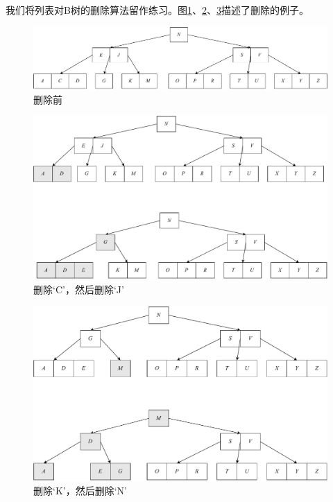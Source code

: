 \documentclass[b5paper]{ctexart}
\begin{document}
我们将列表对B树的删除算法留作练习。图\cref{fig:btree-del-before}、\cref{fig:btree-del-CJ}、\cref{fig:btree-del-KN}描述了删除的例子。

\begin{figure}[htbp]
  \centering
  \includegraphics[scale=0.33]{img/btree-del-before}
  \caption{删除前}
  \label{fig:btree-del-before}
\end{figure}

\begin{figure}[htbp]
  \centering
  \includegraphics[scale=0.33]{img/btree-del-CJ}
  \caption{删除`C'，然后删除`J'}
  \label{fig:btree-del-CJ}
\end{figure}

\begin{figure}[htbp]
  \centering
  \includegraphics[scale=0.33]{img/btree-del-KN}
  \caption{删除`K'，然后删除`N'}
  \label{fig:btree-del-KN}
\end{figure}
\end{document}
